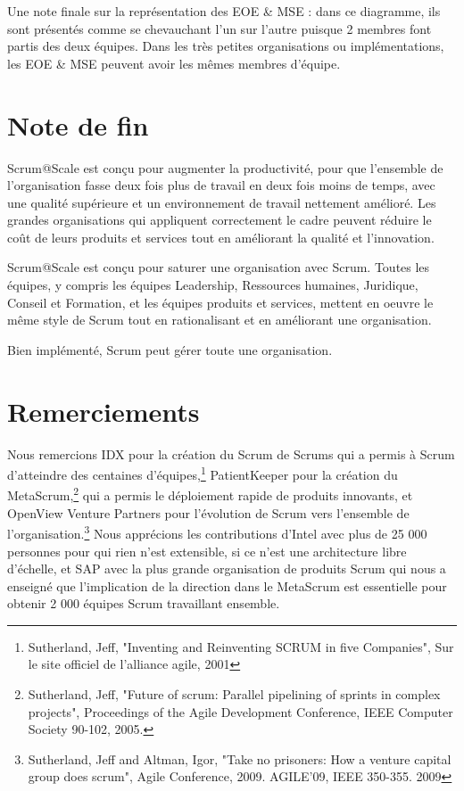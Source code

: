 \documentclass[12pt,a4paper,parskip=full]{scrartcl}
\begin{document}
Une note finale sur la représentation des EOE \& MSE : dans ce diagramme, ils sont
présentés comme se chevauchant l’un sur l’autre puisque 2 membres font partis des deux
équipes. Dans les très petites organisations ou implémentations, les EOE \& MSE peuvent
avoir les mêmes membres d'équipe.

\section{Note de fin}
Scrum@Scale est conçu pour augmenter la productivité, pour que l'ensemble de
l'organisation fasse deux fois plus de travail en deux fois moins de temps, avec une qualité
supérieure et un environnement de travail nettement amélioré. Les grandes organisations
qui appliquent correctement le cadre peuvent réduire le coût de leurs produits et services
tout en améliorant la qualité et l'innovation.

Scrum@Scale est conçu pour saturer une organisation avec Scrum. Toutes les équipes, y
compris les équipes Leadership, Ressources humaines, Juridique, Conseil et Formation,
et les équipes produits et services, mettent en oeuvre le même style de Scrum tout en
rationalisant et en améliorant une organisation.

Bien implémenté, Scrum peut gérer toute une organisation.

\section{Remerciements}
Nous remercions IDX pour la création du Scrum de Scrums qui a permis à Scrum
d'atteindre des centaines d'équipes,\footnote{Sutherland, Jeff,
"Inventing and Reinventing SCRUM in five Companies", Sur le site officiel
de l'alliance agile, 2001} PatientKeeper pour la création du MetaScrum,\footnote{Sutherland, Jeff, "Future of scrum: Parallel pipelining
of sprints in complex projects", Proceedings of the Agile Development
Conference,  IEEE Computer Society 90-102,  2005.} qui a
permis le déploiement rapide de produits innovants, et OpenView Venture Partners pour
l'évolution de Scrum vers l'ensemble de l'organisation.\footnote{Sutherland, Jeff and Altman,
Igor, "Take no prisoners: How a venture capital group does scrum", Agile
Conference, 2009. AGILE'09, IEEE 350-355.  2009} Nous apprécions les contributions
d'Intel avec plus de 25 000 personnes pour qui rien n’est extensible, si ce n’est une
architecture libre d’échelle, et SAP avec la plus grande organisation de produits Scrum qui
nous a enseigné que l'implication de la direction dans le MetaScrum est essentielle pour
obtenir 2 000 équipes Scrum travaillant ensemble.
\end{document}
